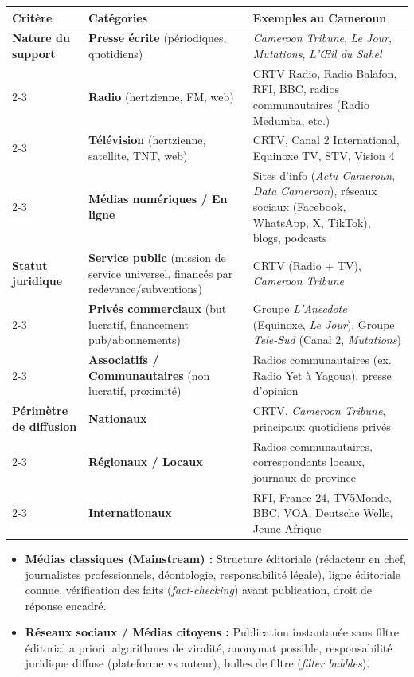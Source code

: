 \documentclass[11pt]{article}
\begin{document}
\begin{center}
\begin{tabularx}{\linewidth}{|l|X|X|}\hline
\rowcolor{popblueL}
\textbf{Critère} & \textbf{Catégories} & \textbf{Exemples au Cameroun} \\ \hline
\textbf{Nature du support} & \textbf{Presse écrite} (périodiques, quotidiens) & \emph{Cameroon Tribune}, \emph{Le Jour}, \emph{Mutations}, \emph{L'Œil du Sahel} \\ \cline{2-3}
& \textbf{Radio} (hertzienne, FM, web) & CRTV Radio, Radio Balafon, RFI, BBC, radios communautaires (Radio Medumba, etc.) \\ \cline{2-3}
& \textbf{Télévision} (hertzienne, satellite, TNT, web) & CRTV, Canal 2 International, Equinoxe TV, STV, Vision 4 \\ \cline{2-3}
& \textbf{Médias numériques / En ligne} & Sites d'info (\emph{Actu Cameroun}, \emph{Data Cameroon}), réseaux sociaux (Facebook, WhatsApp, X, TikTok), blogs, podcasts \\ \hline
\textbf{Statut juridique} & \textbf{Service public} (mission de service universel, financés par redevance/subventions) & CRTV (Radio + TV), \emph{Cameroon Tribune} \\ \cline{2-3}
& \textbf{Privés commerciaux} (but lucratif, financement pub/abonnements) & Groupe \emph{L'Anecdote} (Equinoxe, \emph{Le Jour}), Groupe \emph{Tele-Sud} (Canal 2, \emph{Mutations}) \\ \cline{2-3}
& \textbf{Associatifs / Communautaires} (non lucratif, proximité) & Radios communautaires (ex. Radio Yet à Yagoua), presse d'opinion \\ \hline
\textbf{Périmètre de diffusion} & \textbf{Nationaux} & CRTV, \emph{Cameroon Tribune}, principaux quotidiens privés \\ \cline{2-3}
& \textbf{Régionaux / Locaux} & Radios communautaires, correspondants locaux, journaux de province \\ \cline{2-3}
& \textbf{Internationaux} & RFI, France 24, TV5Monde, BBC, VOA, Deutsche Welle, Jeune Afrique \\ \hline
\end{tabularx}
\end{center}

\begin{aretenir}
\begin{itemize}
    \item \textbf{Médias classiques (Mainstream) :} Structure éditoriale (rédacteur en chef, journalistes professionnels, déontologie, responsabilité légale), ligne éditoriale connue, vérification des faits (\emph{fact-checking}) avant publication, droit de réponse encadré.
    \item \textbf{Réseaux sociaux / Médias citoyens :} Publication instantanée sans filtre éditorial a priori, algorithmes de viralité, anonymat possible, responsabilité juridique diffuse (plateforme vs auteur), bulles de filtre (\emph{filter bubbles}).
\end{itemize}
\end{aretenir}
\end{document}
